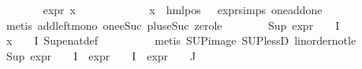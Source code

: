 \begin{isabellebody}
\ \ \ \ \ \ \isamarkupfalse%
\ {\isachardoublequoteopen}expr{\isacharunderscore}{\kern0pt}{}\ x\ {\isasymge}\ {}{\isachardoublequoteclose}\ \isanewline
\ \ \ \ \ \ \ \ \isamarkupfalse%
\ {\isacartoucheopen}x\ {\isacharequal}{\kern0pt}\ hml{\isacharunderscore}{\kern0pt}pos\ {\isasymalpha}\ {\isasympsi}{\isacartoucheclose}\ expr{\isacharunderscore}{\kern0pt}{}{\isachardot}{\kern0pt}simps{\isacharparenleft}{\kern0pt}{}{\isacharparenright}{\kern0pt}\ one{\isacharunderscore}{\kern0pt}add{\isacharunderscore}{\kern0pt}one\ \isanewline
\ \ \ \ \ \ \ \ \isamarkupfalse%
\ {\isacharparenleft}{\kern0pt}metis\ add{\isacharunderscore}{\kern0pt}left{\isacharunderscore}{\kern0pt}mono\ one{\isacharunderscore}{\kern0pt}eSuc\ plus{\isacharunderscore}{\kern0pt}{}{\isacharunderscore}{\kern0pt}eSuc{\isacharparenleft}{\kern0pt}{}{\isacharparenright}{\kern0pt}\ zero{\isacharunderscore}{\kern0pt}le{\isacharparenright}{\kern0pt}\isanewline
\ \ \ \ \ \ \isamarkupfalse%
\ {\isachardoublequoteopen}Sup\ {\isacharparenleft}{\kern0pt}{\isacharparenleft}{\kern0pt}expr{\isacharunderscore}{\kern0pt}{}\ {\isasymcirc}\ {\isasymPhi}{\isacharparenright}{\kern0pt}\ {\isacharbackquote}{\kern0pt}\ I{\isacharparenright}{\kern0pt}\ {\isachargreater}{\kern0pt}{\isacharequal}{\kern0pt}\ {}{\isachardoublequoteclose}\isanewline
\ \ \ \ \ \ \ \ \isamarkupfalse%
\ {\isacartoucheopen}x\ {\isasymin}\ {\isacharparenleft}{\kern0pt}{\isasymPhi}\ {\isacharbackquote}{\kern0pt}\ I{\isacharparenright}{\kern0pt}{\isacartoucheclose}\ Sup{\isacharunderscore}{\kern0pt}enat{\isacharunderscore}{\kern0pt}def\isanewline
\ \ \ \ \ \ \ \ \isamarkupfalse%
\ {\isacharparenleft}{\kern0pt}metis\ SUP{\isacharunderscore}{\kern0pt}image\ SUP{\isacharunderscore}{\kern0pt}lessD\ linorder{\isacharunderscore}{\kern0pt}not{\isacharunderscore}{\kern0pt}le{\isacharparenright}{\kern0pt}\isanewline
\ \ \ \ \ \ \isamarkupfalse%
\ {\isachardoublequoteopen}{\isacharparenleft}{\kern0pt}Sup\ {\isacharparenleft}{\kern0pt}{\isacharparenleft}{\kern0pt}expr{\isacharunderscore}{\kern0pt}{}\ {\isasymcirc}\ {\isasymPhi}{\isacharparenright}{\kern0pt}\ {\isacharbackquote}{\kern0pt}\ I\ {\isasymunion}\ {\isacharparenleft}{\kern0pt}expr{\isacharunderscore}{\kern0pt}{}\ {\isasymcirc}\ {\isasymPhi}{\isacharparenright}{\kern0pt}\ {\isacharbackquote}{\kern0pt}\ I\ {\isasymunion}\ {\isacharparenleft}{\kern0pt}expr{\isacharunderscore}{\kern0pt}{}\ {\isasymcirc}\ {\isasymPhi}{\isacharparenright}{\kern0pt}\ {\isacharbackquote}{\kern0pt}\ J{\isacharparenright}{\kern0pt}{\isacharparenright}{\kern0pt}\ {\isasymge}\ {}{\isachardoublequoteclose}\isanewline

\end{isabellebody}
